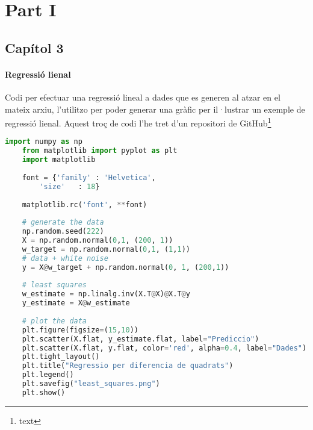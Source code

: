 \section{Part I}
\subsection{Capítol 3}

\paragraph{Regressió lienal}
\label{lst:linear_regression}
Codi per efectuar una regressió lineal a dades que es generen al atzar en el mateix arxiu, l'utilitzo per poder generar una gràfic per il·lustrar un exemple de regressió lienal. Aquest troç de codi l'he tret d'un repositori de GitHub\footnote{text}

\begin{lstlisting}[language=Python, caption=Regressió lineal]
	import numpy as np
	from matplotlib import pyplot as plt
	import matplotlib
	
	font = {'family' : 'Helvetica',
		'size'   : 18}
	
	matplotlib.rc('font', **font)
	
	# generate the data
	np.random.seed(222)
	X = np.random.normal(0,1, (200, 1))
	w_target = np.random.normal(0,1, (1,1))
	# data + white noise
	y = X@w_target + np.random.normal(0, 1, (200,1))
	
	# least squares
	w_estimate = np.linalg.inv(X.T@X)@X.T@y
	y_estimate = X@w_estimate
	
	# plot the data
	plt.figure(figsize=(15,10))
	plt.scatter(X.flat, y_estimate.flat, label="Prediccio")
	plt.scatter(X.flat, y.flat, color='red', alpha=0.4, label="Dades")
	plt.tight_layout()
	plt.title("Regressio per diferencia de quadrats")
	plt.legend()
	plt.savefig("least_squares.png")
	plt.show()
\end{lstlisting}

